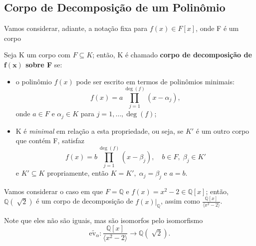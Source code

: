 \documentclass[../algebraIII_notes.tex]{subfiles}
\begin{document}
\subsection{Corpo de Decomposição de um Polinômio}
Vamos considerar, adiante, a notação fixa para \(f(x)\in F[x]\), onde F é um corpo
\begin{def*}
	Seja K um corpo com \(F\subseteq K\); então, K é chamado \textbf{corpo de decomposição de \(\mathbf{f(x)}\) sobre F} se:
	\begin{itemize}
		\item[1)] o polinômio \(f(x)\) pode ser escrito em termos de polinômios minimais:
		      \[
			      f(x)=a \prod\limits_{j=1}^{\deg{(f)}}(x-\alpha_{j}),
		      \]
		      onde \(a\in F\) e \(\alpha_{j}\in K\) para \(j=1,\dotsc , \deg{(f)}\);
		\item[2)] K é \textit{minimal} em relação a esta propriedade, ou seja, se \(K'\) é um outro corpo que contém F, satisfaz
		      \[
			      f(x)=b \prod\limits_{j=1}^{\deg{(f)}}(x-\beta_{j}),\quad b\in F, \; \beta_{j}\in K'
		      \]
		      e \(K'\subseteq K\) propriamente, então \(K=K',\;\alpha_{j}=\beta_{j}\) e \(a=b\).
	\end{itemize}
\end{def*}
\begin{example}
	Vamos considerar o caso em que \(F=\mathbb{Q}\) e \(f(x)=x^{2}-2\in \mathbb{Q}[x]\); então, \(\mathbb{Q}(\sqrt[]{2})\) é um corpo de decomposição de \(f(x)|_{\mathbb{Q}}\), assim como \(\displaystyle \frac{\mathbb{Q}[x]}{\langle x^{2}-2 \rangle}\).

	Note que eles não são iguais, mas são isomorfos pelo isomorfismo
	\[
		\widetilde{\mathrm{ev}_{\alpha }}:\frac{\mathbb{Q}[x]}{\langle x^{2}-2 \rangle}\rightarrow \mathbb{Q}(\sqrt[]{2}).
	\]
\end{example}
\end{document}
